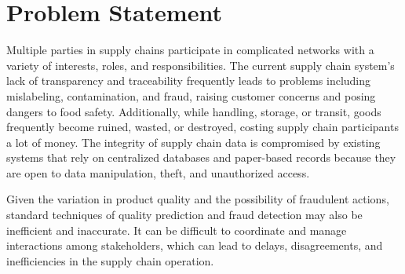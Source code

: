 \section{Problem Statement}
\noindent
Multiple parties in supply chains participate in complicated networks with a variety of interests, roles, and responsibilities. 
The current supply chain system's lack of transparency and traceability frequently leads to problems including mislabeling, 
contamination, and fraud, raising customer concerns and posing dangers to food safety. Additionally, while handling, 
storage, or transit, goods frequently become ruined, wasted, or destroyed, costing supply chain participants a lot of money. 
The integrity of supply chain data is compromised by existing systems that rely on centralized databases and paper-based 
records because they are open to data manipulation, theft, and unauthorized access.
\par Given the variation in product quality and the possibility of fraudulent actions, standard techniques of quality prediction 
and fraud detection may also be inefficient and inaccurate. It can be difficult to coordinate and manage interactions among 
stakeholders, which can lead to delays, disagreements, and inefficiencies in the supply chain operation.







